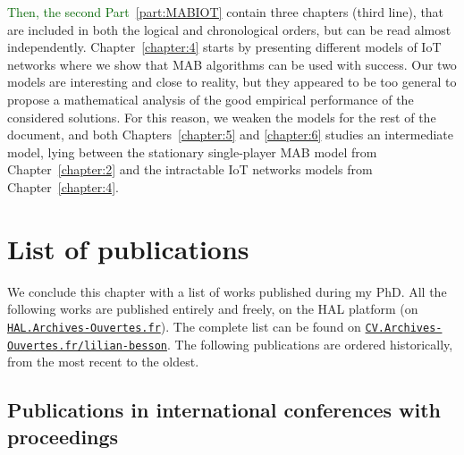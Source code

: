 \textcolor{darkgreen}{Then, the second Part~\ref{part:MABIOT}} contain three chapters (third line), that are included in both the logical and chronological orders, but can be read almost independently.
Chapter~\ref{chapter:4} starts by presenting different models of IoT networks where we show that MAB algorithms can be used with success.
Our two models are interesting and close to reality, but they appeared to be too general to propose a mathematical analysis of the good empirical performance of the considered solutions.
For this reason, we weaken the models for the rest of the document,
and both Chapters~\ref{chapter:5} and \ref{chapter:6} studies an intermediate model, lying between the stationary single-player MAB model from Chapter~\ref{chapter:2} and the intractable IoT networks models from Chapter~\ref{chapter:4}.




\section{List of publications}
\label{sec:1:listPublications}


We conclude this chapter with a list of works published during my PhD.
All the following works are published entirely and freely, on the HAL platform (on \href{https://hal.archives-ouvertes.fr/}{\texttt{HAL.Archives-Ouvertes.fr}}).
The complete list can be found on
\href{https://cv.archives-ouvertes.fr/lilian-besson/}{\texttt{CV.Archives-Ouvertes.fr/lilian-besson}}.
%
The following publications are ordered historically, from the most recent to the oldest.


\subsection*{Publications in international conferences with proceedings}

